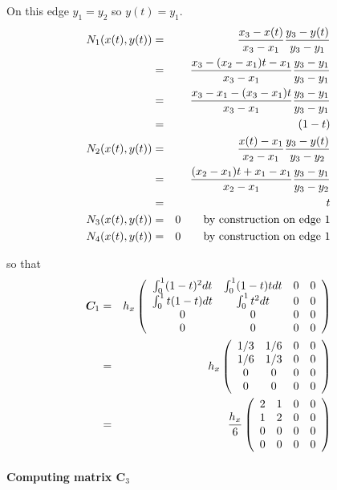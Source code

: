 On this edge $y_1=y_2$ so $y(t)=y_1$.
\begin{eqnarray}
N_1(x(t),y(t)) 
&=&  \frac{x_3-x(t)}{x_3-x_1} \frac{y_3-y(t)}{y_3-y_1} \nonumber\\
&=&  \frac{x_3- (x_2-x_1)t -x_1  }{x_3-x_1} \frac{y_3 -y_1  }{y_3-y_1} \nonumber\\
&=&  \frac{x_3-x_1 -(x_3-x_1)t }{x_3-x_1} \frac{y_3-y_1 }{y_3-y_1} \nonumber\\
&=&  (1-t) \\ 
N_2(x(t),y(t)) 
&=&  \frac{x(t)-x_1}{x_2-x_1} \frac{y_3-y(t)}{y_3-y_2} \nonumber\\
&=&  \frac{(x_2-x_1)t +x_1   -x_1}{x_2-x_1} \frac{y_3 -y_1}{y_3-y_2} \nonumber\\
&=&  t \\ 
N_3(x(t),y(t)) &=&  0  \qquad \text{by construction on edge 1} \\
N_4(x(t),y(t)) &=&  0  \qquad \text{by construction on edge 1} 
\end{eqnarray}





so that
\begin{eqnarray}
{\bm C}_1 
&=&
h_x
\left(
\begin{array}{cccc}
\int_{0}^1 (1-t)^2 dt & 
\int_{0}^1 (1-t)t  dt &
0 & 
0 \\
\int_{0}^1 t(1-t) dt & 
\int_{0}^1 t^2 dt &
0 &
0 \\
0 & 0 & 0 & 0 \\
0 & 0 & 0 & 0 
\end{array}
\right) \nonumber\\
&=&
h_x
\left(
\begin{array}{cccc}
1/3 & 1/6 & 0 & 0\\
1/6 & 1/3 & 0 & 0 \\
0 & 0 & 0 & 0 \\
0 & 0 & 0 & 0 
\end{array}
\right) \nonumber\\
&=&
\frac{h_x}{6}
\left(
\begin{array}{cccc}
2 & 1 & 0 & 0\\
1 & 2 & 0 & 0 \\
0 & 0 & 0 & 0 \\
0 & 0 & 0 & 0 
\end{array}
\right) 
\end{eqnarray}


\paragraph{Computing matrix ${\bm C}_3$}

